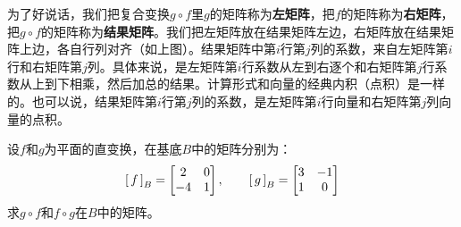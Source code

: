 \documentclass[12pt,UTF8,fontset=none]{ctexbook}
\begin{document}
为了好说话，我们把复合变换$g\circ f$里$g$的矩阵称为\textbf{左矩阵}，把$f$的矩阵称为\textbf{右矩阵}，把$g\circ f$的矩阵称为\textbf{结果矩阵}。我们把左矩阵放在结果矩阵左边，右矩阵放在结果矩阵上边，各自行列对齐（如上图）。结果矩阵中第$i$行第$j$列的系数，来自左矩阵第$i$行和右矩阵第$j$列。具体来说，是左矩阵第$i$行系数从左到右逐个和右矩阵第$j$行系数从上到下相乘，然后加总的结果。计算形式和向量的经典内积（点积）是一样的。也可以说，结果矩阵第$i$行第$j$列的系数，是左矩阵第$i$行向量和右矩阵第$j$列向量的点积。

\begin{et}
    设$f$和$g$为平面的直变换，在基底$B$中的矩阵分别为：
    $$
        \bmat{f}[B] = 
        \begin{bmatrix}
            2 & 0 \\ -4 & 1
        \end{bmatrix},\qquad
        \bmat{g}[B] = 
        \begin{bmatrix}
            3 & -1 \\ 1 & 0
        \end{bmatrix}
    $$
    求$g\circ f$和$f\circ g$在$B$中的矩阵。
\end{et}
\end{document}
